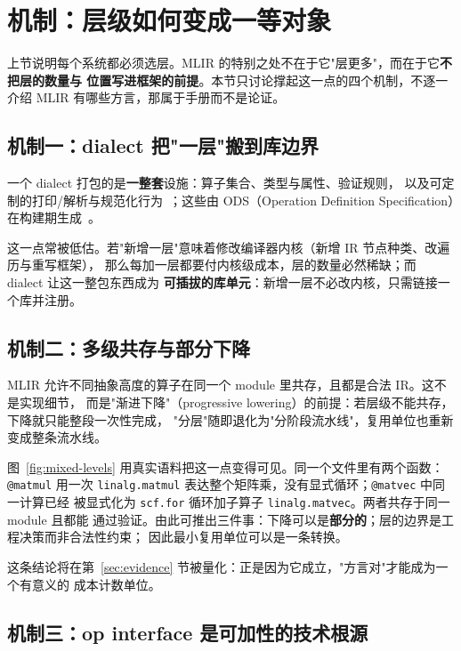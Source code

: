 
\section{机制：层级如何变成一等对象}
\label{sec:mechanisms}

上节说明每个系统都必须选层。MLIR 的特别之处不在于它"层更多"，而在于它\textbf{不把层的数量与
位置写进框架的前提}。本节只讨论撑起这一点的四个机制，不逐一介绍 MLIR 有哪些方言，那属于手册而不是论证。

\subsection{机制一：dialect 把"一层"搬到库边界}

一个 dialect 打包的是\textbf{一整套}设施：算子集合、类型与属性、验证规则，
以及可定制的打印/解析与规范化行为~\cite{mlir21}；这些由 ODS（Operation Definition
Specification）在构建期生成~\cite{mlirods}。

这一点常被低估。若"新增一层"意味着修改编译器内核（新增 IR 节点种类、改遍历与重写框架），
那么每加一层都要付内核级成本，层的数量必然稀缺；而 dialect 让这一整包东西成为
\textbf{可插拔的库单元}：新增一层不必改内核，只需链接一个库并注册。

\subsection{机制二：多级共存与部分下降}

MLIR 允许不同抽象高度的算子在同一个 module 里共存，且都是合法 IR。这不是实现细节，
而是"渐进下降"（progressive lowering）的前提：若层级不能共存，下降就只能整段一次性完成，
"分层"随即退化为"分阶段流水线"，复用单位也重新变成整条流水线。

图~\ref{fig:mixed-levels} 用真实语料把这一点变得可见。同一个文件里有两个函数：\texttt{@matmul}
用一次 \texttt{linalg.matmul} 表达整个矩阵乘，没有显式循环；\texttt{@matvec} 中同一计算已经
被显式化为 \texttt{scf.for} 循环加子算子 \texttt{linalg.matvec}。两者共存于同一 module 且都能
通过验证。由此可推出三件事：下降可以是\textbf{部分的}；层的边界是工程决策而非合法性约束；
因此最小复用单位可以是一条转换。

这条结论将在第~\ref{sec:evidence} 节被量化：正是因为它成立，"方言对"才能成为一个有意义的
成本计数单位。

\subsection{机制三：op interface 是可加性的技术根源}

